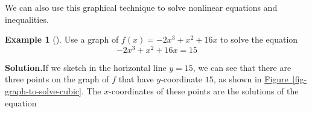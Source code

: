\documentclass[10pt,]{book}
\theoremstyle{plain}
\theoremstyle{definition}
\theoremstyle{definition}
\newtheorem{example}[theorem]{Example}
\newcounter{figstack}
\newlength\fight
\newcommand\pushValignCaptionBottom[5][b]{%
\stepcounter{figstack}%
\expandafter\def\csname %
figalign\romannumeral\value{figstack}\endcsname{#1}%
\expandafter\def\csname %
figtype\romannumeral\value{figstack}\endcsname{#2}%
\expandafter\def\csname %
figwd\romannumeral\value{figstack}\endcsname{#3}%
\expandafter\def\csname %
figcontent\romannumeral\value{figstack}\endcsname{#4}%
\expandafter\def\csname %
figcap\romannumeral\value{figstack}\endcsname{#5}%
\setbox0=\hbox{%
\begin{#2}{#3}#4\end{#2}}%
\ifdim\dimexpr\ht0+\dp0\relax>\fight\global\setlength{\fight}{%
\dimexpr\ht0+\dp0\relax}\fi%
}
\newcommand{\alert}[1]{\mathbf{\color{magenta}{#1}}}
\begin{document}
\par
We can also use this graphical technique to solve nonlinear equations and inequalities.%
\begin{example}[]\label{example-graph-to-solve-cubic}
Use a graph of \(f(x) = −2x^3 + x^2 + 16x\) to solve the equation 
    \begin{equation*}−2x^3 + x^2 + 16x = 15\end{equation*}%
\par\medskip\noindent%
\textbf{Solution.}\quad If we sketch in the horizontal line \(y = 15\), we can see that there are three points on the graph of \(f\) that have \(y\)-coordinate \(15\), as shown in \hyperref[fig-graph-to-solve-cubic]{Figure~\ref{fig-graph-to-solve-cubic}}. The \(x\)-coordinates of these points are the solutions of the equation %
\leavevmode%
\end{example}
\end{document}
